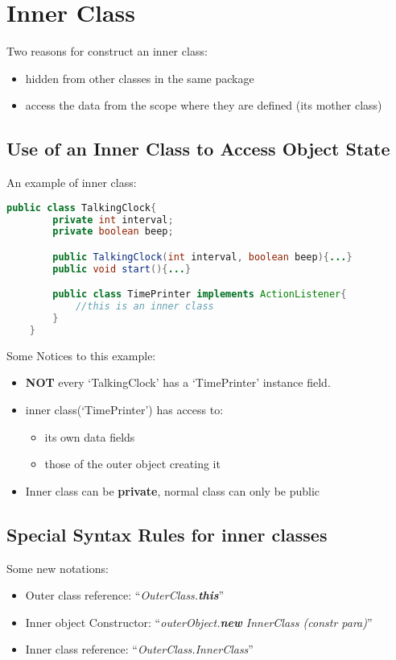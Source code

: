 \documentclass[12pt]{article}
\begin{document}
\section{Inner Class}
Two reasons for construct an inner class:
\begin{itemize}
    \item hidden from other classes in the same package
    \item access the data from the scope where they are defined (its mother class)
\end{itemize}

\subsection{Use of an Inner Class to Access Object State}
An example of inner class:
\begin{lstlisting}[language=Java]
    public class TalkingClock{
        private int interval;
        private boolean beep;

        public TalkingClock(int interval, boolean beep){...}
        public void start(){...}

        public class TimePrinter implements ActionListener{
            //this is an inner class
        }
    }
\end{lstlisting}

Some Notices to this example:
\begin{itemize}
    \item \textbf{NOT} every `TalkingClock' has a `TimePrinter' instance field.
    \item inner class(`TimePrinter') has access to:
    \begin{itemize}
        \item its own data fields
        \item those of the outer object creating it
    \end{itemize}
    \item Inner class can be \textbf{private}, normal class can only be public
\end{itemize}

\subsection{Special Syntax Rules for inner classes}
Some new notations:
\begin{itemize}
    \item Outer class reference: ``\emph{OuterClass.\textbf{this}}''
    \item Inner object Constructor: ``\emph{outerObject.\textbf{new} InnerClass (constr para)}''
    \item Inner class reference: ``\emph{OuterClass.InnerClass}''
\end{itemize}
\end{document}
